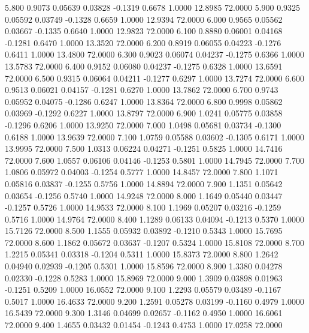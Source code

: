   5.800   0.9073   0.05639   0.03828  -0.1319   0.6678   1.0000  12.8985  72.0000
   5.900   0.9325   0.05592   0.03749  -0.1328   0.6659   1.0000  12.9394  72.0000
   6.000   0.9565   0.05562   0.03667  -0.1335   0.6640   1.0000  12.9823  72.0000
   6.100   0.8880   0.06001   0.04168  -0.1281   0.6470   1.0000  13.3520  72.0000
   6.200   0.8919   0.06055   0.04223  -0.1276   0.6411   1.0000  13.4800  72.0000
   6.300   0.9023   0.06074   0.04237  -0.1275   0.6366   1.0000  13.5783  72.0000
   6.400   0.9152   0.06080   0.04237  -0.1275   0.6328   1.0000  13.6591  72.0000
   6.500   0.9315   0.06064   0.04211  -0.1277   0.6297   1.0000  13.7274  72.0000
   6.600   0.9513   0.06021   0.04157  -0.1281   0.6270   1.0000  13.7862  72.0000
   6.700   0.9743   0.05952   0.04075  -0.1286   0.6247   1.0000  13.8364  72.0000
   6.800   0.9998   0.05862   0.03969  -0.1292   0.6227   1.0000  13.8797  72.0000
   6.900   1.0241   0.05775   0.03858  -0.1296   0.6206   1.0000  13.9250  72.0000
   7.000   1.0498   0.05681   0.03734  -0.1300   0.6188   1.0000  13.9639  72.0000
   7.100   1.0759   0.05588   0.03602  -0.1305   0.6171   1.0000  13.9995  72.0000
   7.500   1.0313   0.06224   0.04271  -0.1251   0.5825   1.0000  14.7416  72.0000
   7.600   1.0557   0.06106   0.04146  -0.1253   0.5801   1.0000  14.7945  72.0000
   7.700   1.0806   0.05972   0.04003  -0.1254   0.5777   1.0000  14.8457  72.0000
   7.800   1.1071   0.05816   0.03837  -0.1255   0.5756   1.0000  14.8894  72.0000
   7.900   1.1351   0.05642   0.03654  -0.1256   0.5740   1.0000  14.9248  72.0000
   8.000   1.1649   0.05440   0.03447  -0.1257   0.5726   1.0000  14.9533  72.0000
   8.100   1.1969   0.05207   0.03216  -0.1259   0.5716   1.0000  14.9764  72.0000
   8.400   1.1289   0.06133   0.04094  -0.1213   0.5370   1.0000  15.7126  72.0000
   8.500   1.1555   0.05932   0.03892  -0.1210   0.5343   1.0000  15.7695  72.0000
   8.600   1.1862   0.05672   0.03637  -0.1207   0.5324   1.0000  15.8108  72.0000
   8.700   1.2215   0.05341   0.03318  -0.1204   0.5311   1.0000  15.8373  72.0000
   8.800   1.2642   0.04940   0.02939  -0.1205   0.5301   1.0000  15.8596  72.0000
   8.900   1.3380   0.04278   0.02330  -0.1228   0.5283   1.0000  15.8969  72.0000
   9.000   1.3909   0.03898   0.01963  -0.1251   0.5209   1.0000  16.0552  72.0000
   9.100   1.2293   0.05579   0.03489  -0.1167   0.5017   1.0000  16.4633  72.0000
   9.200   1.2591   0.05278   0.03199  -0.1160   0.4979   1.0000  16.5439  72.0000
   9.300   1.3146   0.04699   0.02657  -0.1162   0.4950   1.0000  16.6061  72.0000
   9.400   1.4655   0.03432   0.01454  -0.1243   0.4753   1.0000  17.0258  72.0000
